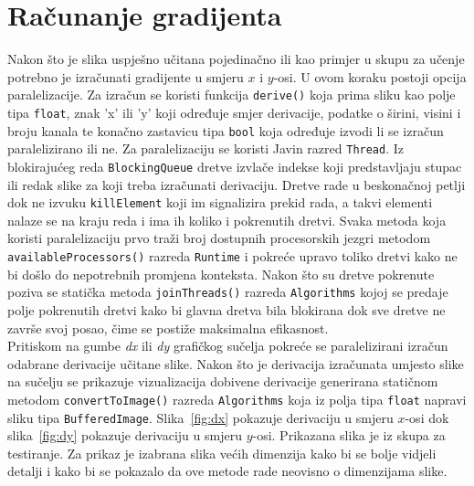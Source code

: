 \documentclass[times, utf8, zavrsni]{fer}
\begin{document}
\section{Računanje gradijenta}
Nakon što je slika uspješno učitana pojedinačno ili kao primjer u skupu za učenje potrebno je izračunati gradijente u smjeru \(x\) i \(y\)-osi. U ovom koraku postoji opcija paralelizacije. Za izračun se koristi funkcija \verb|derive()| koja prima sliku kao polje tipa \verb|float|, znak 'x' ili 'y' koji određuje smjer derivacije, podatke o širini, visini i broju kanala te konačno zastavicu tipa \verb|bool| koja određuje izvodi li se izračun paralelizirano ili ne. Za paralelizaciju se koristi Javin razred \verb|Thread|. Iz blokirajućeg reda \verb|BlockingQueue| dretve izvlače indekse koji predstavljaju stupac ili redak slike za koji treba izračunati derivaciju. Dretve rade u beskonačnoj petlji dok ne izvuku \verb|killElement| koji im signalizira prekid rada, a takvi elementi nalaze se na kraju reda i ima ih koliko i pokrenutih dretvi. Svaka metoda koja koristi paralelizaciju prvo traži broj dostupnih procesorskih jezgri metodom \verb|availableProcessors()| razreda \verb|Runtime| i pokreće upravo toliko dretvi kako ne bi došlo do nepotrebnih promjena konteksta. Nakon što su dretve pokrenute poziva se statička metoda \verb|joinThreads()| razreda \verb|Algorithms| kojoj se predaje polje pokrenutih dretvi kako bi glavna dretva bila blokirana dok sve dretve ne završe svoj posao, čime se postiže maksimalna efikasnost. \\

Pritiskom na gumbe \textit{dx} ili \textit{dy} grafičkog sučelja pokreće se paralelizirani izračun odabrane derivacije učitane slike. Nakon što je derivacija izračunata umjesto slike na sučelju se prikazuje vizualizacija dobivene derivacije generirana statičnom metodom \verb|convertToImage()| razreda \verb|Algorithms| koja iz polja tipa \verb|float| napravi sliku tipa \verb|BufferedImage|. Slika~\ref{fig:dx} pokazuje derivaciju u smjeru \(x\)-osi dok slika~\ref{fig:dy} pokazuje derivaciju u smjeru \(y\)-osi. Prikazana slika je iz skupa za testiranje. Za prikaz je izabrana slika većih dimenzija kako bi se bolje vidjeli detalji i kako bi se pokazalo da ove metode rade neovisno o dimenzijama slike.
\end{document}
